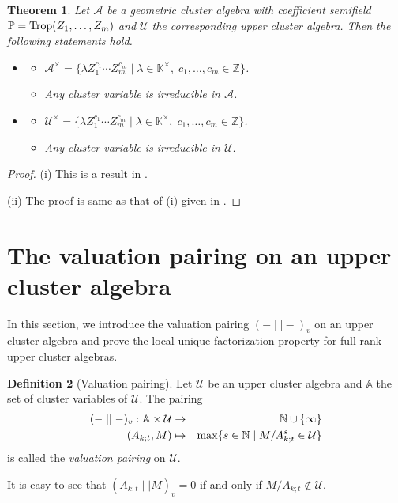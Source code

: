 \documentclass{amsart}
\newtheorem{theorem}{Theorem}[section]
\theoremstyle{definition}
\newtheorem{definition}[theorem]{Definition}
\theoremstyle{remark}
\numberwithin{equation}{section}
\begin{document}
\begin{theorem} \label{thmgls}
Let $\mathcal A$ be a geometric cluster algebra  with coefficient semifield $\mathbb P={\rm Trop}(Z_1,\ldots,Z_m)$ and
$\mathcal U$ the corresponding upper cluster algebra.
Then the following statements hold.
\begin{itemize}
\item[(i)] 
\begin{itemize}
\item[(a)] $\mathcal A^\times=\{\lambda Z_1^{c_1}\cdots Z_m^{c_m}\mid \lambda\in\mathbb K^\times,\; c_1,\ldots,c_m\in \mathbb Z\}$.
\item[(b)] Any cluster variable  is irreducible in $\mathcal A$.
\end{itemize}
\item[(ii)]
\begin{itemize}
\item[(a)] $\mathcal U^\times=\{\lambda Z_1^{c_1}\cdots Z_m^{c_m}\mid \lambda\in\mathbb K^\times,\; c_1,\ldots,c_m\in \mathbb Z\}$.
\item[(b)] Any cluster variable is irreducible  in $\mathcal U$.
\end{itemize}
\end{itemize}
\end{theorem}

\begin{proof}
(i) This is a result in \cite[Theorem 1.3]{GLS13}.

(ii) The proof is same as that of (i) given in  \cite{GLS13}.
\end{proof}




\section{The valuation pairing on an upper cluster algebra}
\label{sec3}
In this section, we  introduce the valuation pairing $(-\mid\mid  -)_v$ on an upper cluster algebra and prove the local unique factorization property for full rank  upper cluster algebras.

\begin{definition}[Valuation pairing] \label{defvalu} Let $\mathcal U$ be an upper cluster algebra and $\mathbb A$ the set of cluster variables of $\mathcal U$. The pairing
\begin{eqnarray}
(-\mid\mid  -)_v:\mathbb A\times\mathcal U&\rightarrow&\mathbb N\cup\{\infty\}\nonumber\\
(A_{k;t},M)&\mapsto&{\rm max}\{s\in\mathbb N\mid M/A_{k;t}^s\in\mathcal U\}\nonumber
\end{eqnarray}
is called the {\em valuation pairing} on $\mathcal U$.
\end{definition}
It is easy to see that $(A_{k;t}\mid\mid  M)_v=0$ if and only if $M/A_{k;t}\notin \mathcal U$.
\end{document}
